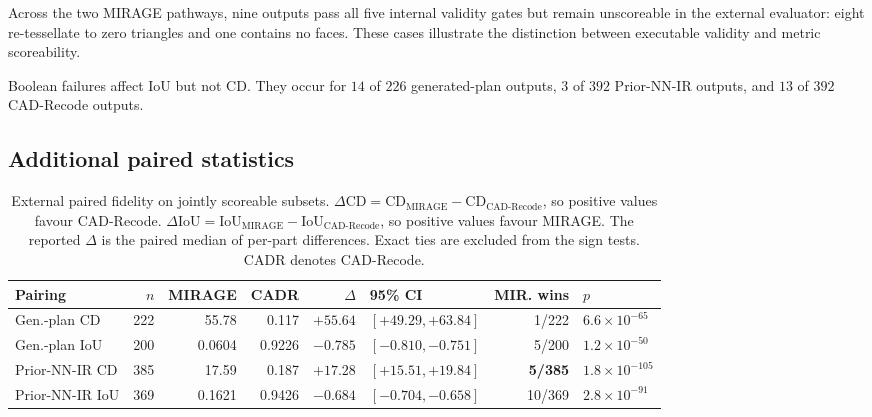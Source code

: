 \documentclass[preprint,12pt]{elsarticle}
\begin{document}
Across the two MIRAGE pathways, nine outputs pass all five internal validity gates but remain unscoreable in the external evaluator: eight re-tessellate to zero triangles and one contains no faces. These cases illustrate the distinction between executable validity and metric scoreability.

Boolean failures affect IoU but not CD. They occur for $14$ of $226$ generated-plan outputs, $3$ of $392$ Prior-NN-IR outputs, and $13$ of $392$ CAD-Recode outputs.

\subsection{Additional paired statistics}
\label{app:external_paired}

\begin{table}[htbp]
  \centering
  \scriptsize
  \setlength{\tabcolsep}{3pt}

  \caption{External paired fidelity on jointly scoreable subsets.
    $\Delta\mathrm{CD}
      =\mathrm{CD}_{\text{MIRAGE}}-\mathrm{CD}_{\text{CAD-Recode}}$,
    so positive values favour CAD-Recode.
    $\Delta\mathrm{IoU}
      =\mathrm{IoU}_{\text{MIRAGE}}-\mathrm{IoU}_{\text{CAD-Recode}}$,
    so positive values favour MIRAGE. The reported $\Delta$ is the paired
    median of per-part differences. Exact ties are excluded from the sign
    tests. CADR denotes CAD-Recode.}
  \label{tab:ext_paired}

  \begin{tabular}{lrrrrlrl}
    \toprule
    Pairing
     & $n$
     & MIRAGE
     & CADR
     & $\Delta$
     & 95\% CI
     & MIR. wins
     & $p$                  \\
    \midrule

    Gen.-plan CD
     & 222
     & 55.78
     & 0.117
     & $+55.64$
     & $[+49.29,+63.84]$
     & 1/222
     & $6.6\times10^{-65}$  \\

    Gen.-plan IoU
     & 200
     & 0.0604
     & 0.9226
     & $-0.785$
     & $[-0.810,-0.751]$
     & 5/200
     & $1.2\times10^{-50}$  \\

    Prior-NN-IR CD
     & 385
     & 17.59
     & 0.187
     & $+17.28$
     & $[+15.51,+19.84]$
     & \textbf{5/385}
     & $1.8\times10^{-105}$ \\

    Prior-NN-IR IoU
     & 369
     & 0.1621
     & 0.9426
     & $-0.684$
     & $[-0.704,-0.658]$
     & 10/369
     & $2.8\times10^{-91}$  \\

    \bottomrule
  \end{tabular}
\end{table}
\end{document}
